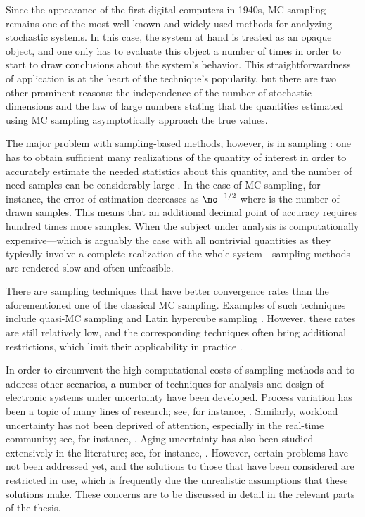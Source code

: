 Since the appearance of the first digital computers in 1940s, \ac{MC} sampling
remains one of the most well-known and widely used methods for analyzing
stochastic systems. In this case, the system at hand is treated as an opaque
object, and one only has to evaluate this object a number of times in order to
start to draw conclusions about the system's behavior. This straightforwardness
of application is at the heart of the technique's popularity, but there are two
other prominent reasons: the independence of the number of stochastic dimensions
and the law of large numbers \cite{durrett2010} stating that the quantities
estimated using \ac{MC} sampling asymptotically approach the true values.

The major problem with sampling-based methods, however, is in sampling \perse:
one has to obtain sufficient many realizations of the quantity of interest in
order to accurately estimate the needed statistics about this quantity, and the
number of need samples can be considerably large \cite{diaz-emparanza2002}. In
the case of \ac{MC} sampling, for instance, the error of estimation decreases as
$\no^{-1/2}$ where \no is the number of drawn samples. This means that an
additional decimal point of accuracy requires hundred times more samples. When
the subject under analysis is computationally expensive---which is arguably the
case with all nontrivial quantities as they typically involve a complete
realization of the whole system---sampling methods are rendered slow and often
unfeasible.

There are sampling techniques that have better convergence rates than the
aforementioned one of the classical \ac{MC} sampling. Examples of such
techniques include quasi-\ac{MC} sampling and Latin hypercube sampling
\cite{asmussen2007}. However, these rates are still relatively low, and the
corresponding techniques often bring additional restrictions, which limit their
applicability in practice \cite{xiu2010}.

In order to circumvent the high computational costs of sampling methods and to
address other scenarios, a number of techniques for analysis and design of
electronic systems under uncertainty have been developed. Process variation has
been a topic of many lines of research; see, for instance, \cite{bhardwaj2006,
bhardwaj2008, chandra2010, juan2012, lee2013}. Similarly, workload uncertainty
has not been deprived of attention, especially in the real-time community; see,
for instance, \cite{diaz2002, santinelli2011, quinton2012, tanasa2015}. Aging
uncertainty has also been studied extensively in the literature; see, for
instance, \cite{coskun2006, huang2009b, das2014c}. However, certain problems
have not been addressed yet, and the solutions to those that have been
considered are restricted in use, which is frequently due the unrealistic
assumptions that these solutions make. These concerns are to be discussed in
detail in the relevant parts of the thesis.
